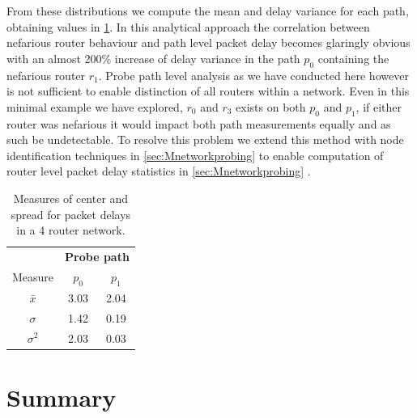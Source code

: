 From these distributions we compute the mean and delay variance for each path, obtaining values in \cref{tbl:4routerstats}. In this analytical approach the correlation between nefarious router behaviour and path level packet delay becomes glaringly obvious with an almost 200\% increase of delay variance in the path $p_0$ containing the nefarious router $r_1$. Probe path level analysis as we have conducted here however is not sufficient to enable distinction of all routers within a network. Even in this minimal example we have explored, $r_0$ and $r_3$ exists on both $p_0$ and $p_1$, if either router was nefarious it would impact both path measurements equally and as such be undetectable. To resolve this problem we extend this method with node identification techniques in \cref{sec:Mnetworkprobing} to enable computation of router level packet delay statistics in \cref{sec:Mnetworkprobing} .
\begin{table}[H]
    \centering
    \begin{tabular}{@{}ccc@{}}
        \toprule
        & \multicolumn{2}{c}{\textbf{Probe path}}\\
        \cmidrule(lr){2-3}
        Measure & $p_0$ & $p_1$ \\
        \midrule
        $\bar{x}$   & 3.03 & 2.04 \\
        $\sigma$    & 1.42 & 0.19 \\
        $\sigma^2$  & 2.03 & 0.03 \\
        \bottomrule
    \end{tabular}
    \caption{Measures of center and spread for packet delays in a 4 router network.}
    \label{tbl:4routerstats}
\end{table}

\section{Summary}
\label{sec:Iintroductionsummary}

